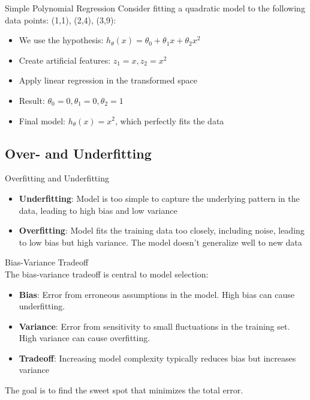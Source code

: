 \begin{example}{Simple Polynomial Regression}
Consider fitting a quadratic model to the following data points: (1,1), (2,4), (3,9):
\begin{itemize}
    \item We use the hypothesis: $h_\theta(x) = \theta_0 + \theta_1 x + \theta_2 x^2$
    \item Create artificial features: $z_1 = x, z_2 = x^2$
    \item Apply linear regression in the transformed space
    \item Result: $\theta_0 = 0, \theta_1 = 0, \theta_2 = 1$
    \item Final model: $h_\theta(x) = x^2$, which perfectly fits the data
\end{itemize}
\end{example}

\subsection{Over- and Underfitting}

\begin{definition}{Overfitting and Underfitting}
\begin{itemize}
    \item \textbf{Underfitting}: Model is too simple to capture the underlying pattern in the data, leading to high bias and low variance
    \item \textbf{Overfitting}: Model fits the training data too closely, including noise, leading to low bias but high variance. The model doesn't generalize well to new data
\end{itemize}
\end{definition}

\begin{concept}{Bias-Variance Tradeoff}\\
The bias-variance tradeoff is central to model selection:
\begin{itemize}
    \item \textbf{Bias}: Error from erroneous assumptions in the model. High bias can cause underfitting.
    \item \textbf{Variance}: Error from sensitivity to small fluctuations in the training set. High variance can cause overfitting.
    \item \textbf{Tradeoff}: Increasing model complexity typically reduces bias but increases variance
\end{itemize}
The goal is to find the sweet spot that minimizes the total error.
\end{concept}

